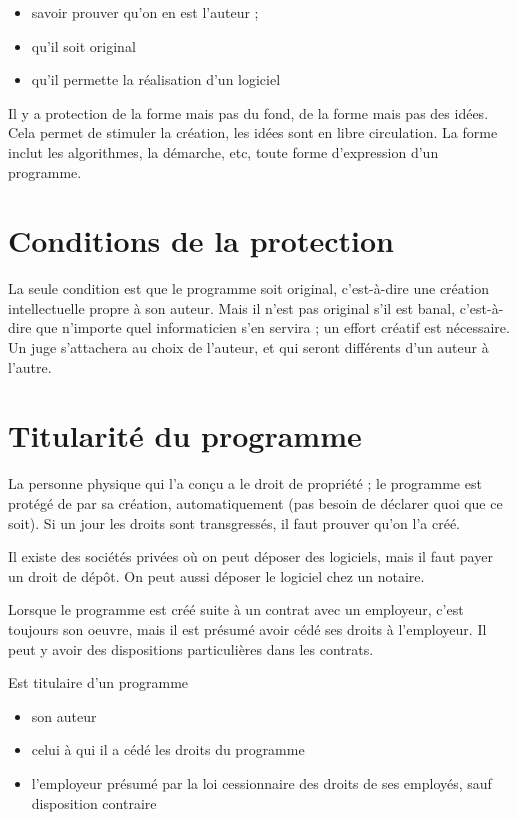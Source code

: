 	\begin{itemize}
		\item savoir prouver qu'on en est l'auteur ;
		\item qu'il soit original
		\item qu'il permette la réalisation d'un logiciel
	\end{itemize}
	
	Il y a protection de la forme mais pas du fond, de la forme mais pas des idées. Cela permet de stimuler la création, les idées sont en libre circulation. La forme inclut les algorithmes, la démarche, etc, toute forme d'expression d'un programme.
	
	\section{Conditions de la protection}
	
	La seule condition est que le programme soit original, c'est-à-dire une création intellectuelle propre à son auteur. Mais il n'est pas original s'il est banal, c'est-à-dire que n'importe quel informaticien s'en servira ; un effort créatif est nécessaire. Un juge s'attachera au choix de l'auteur, et qui seront différents d'un auteur à l'autre.
	
	\section{Titularité du programme}
	
	La personne physique qui l'a conçu a le droit de propriété ; le programme est protégé de par sa création, automatiquement (pas besoin de déclarer quoi que ce soit). Si un jour les droits sont transgressés, il faut prouver qu'on l'a créé.
	
	Il existe des sociétés privées où on peut déposer des logiciels, mais il faut payer un droit de dépôt. On peut aussi déposer le logiciel chez un notaire.
	
	Lorsque le programme est créé suite à un contrat avec un employeur, c'est toujours son oeuvre, mais il est présumé avoir cédé ses droits à l'employeur. Il peut y avoir des dispositions particulières dans les contrats.
	
	Est titulaire d'un programme
	
	\begin{itemize}
		\item son auteur
		\item celui à qui il a cédé les droits du programme
		\item l'employeur présumé par la loi cessionnaire des droits de ses employés, sauf disposition contraire
	\end{itemize}
	
